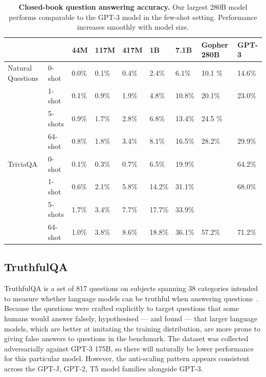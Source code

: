 \documentclass[11pt, a4paper, logo, internal, copyright, nonumbering]{deepmind}
\begin{document}
\begin{table}[b]
\scriptsize
\centering
\begin{tabular}{llllllll|l}
\toprule
& & \textbf{44M}     & \textbf{117M}    & \textbf{417M}    & \textbf{1B}   &  \textbf{7.1B}   &  \textbf{Gopher 280B} & GPT-3 \\
\midrule
Natural Questions & 0-shot      &  0.0\% &  0.1\% &  0.4\% &  2.4\% &   6.1\% &     10.1 \% & 14.6\% \\
& 1-shot      &  0.1\% &  0.9\% &  1.9\% &  4.8\% &  10.8\% &  20.1\% & 23.0\% \\
& 5-shots     &  0.9\% &  1.7\% &  2.8\% &  6.8\% &  13.4\% &     24.5 \% & \\
& 64-shot     &  0.8\% &  1.8\% &  3.4\% &  8.1\% &  16.5\% &  28.2\% & 29.9\% \\
TriviaQA & 0-shot      &  0.1\% &  0.3\% &  0.7\% &   6.5\% &  19.9\% & & 64.2\% \\
& 1-shot      &  0.6\% &  2.1\% &  5.8\% &  14.2\% &  31.1\% & & 68.0\% \\
& 5-shots     &  1.7\% &  3.4\% &  7.7\% &  17.7\% &  33.9\% & &\\
& 64-shot     &  1.0\% &  3.8\% &  8.6\% &  18.8\% &  36.1\% & 57.2\% & 71.2\%\\
\bottomrule
\end{tabular}
\caption{\textbf{Closed-book question answering accuracy.} Our largest 280B model performs comparable to the GPT-3 model in the few-shot setting. Performance increases smoothly with model size.}
\end{table}


\subsection{TruthfulQA}
\label{appendix:truthfulqa}

TruthfulQA is a set of 817 questions on subjects spanning 38 categories intended to measure whether language models can be truthful when answering questions~\citep{truthfulqa}. Because the questions were crafted explicitly to target questions that some humans would answer falsely, \cite{truthfulqa} hypothesised --- and found --- that larger language models, which are better at imitating the training distribution, are more prone to giving false answers to questions in the benchmark. The dataset was collected adversarially against GPT-3 175B, so there will naturally be lower performance for this particular model. However, the anti-scaling pattern appears consistent across the GPT-J, GPT-2, T5 model families alongside GPT-3.
\end{document}
